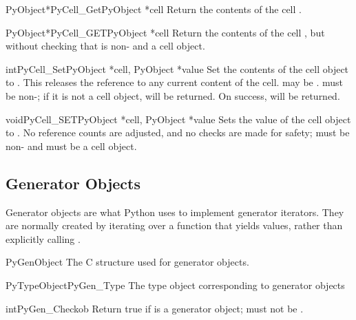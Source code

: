\begin{cfuncdesc}{PyObject*}{PyCell_Get}{PyObject *cell}
  Return the contents of the cell .
\end{cfuncdesc}

\begin{cfuncdesc}{PyObject*}{PyCell_GET}{PyObject *cell}
  Return the contents of the cell , but without checking
  that  is non-\NULL{} and a cell object.
\end{cfuncdesc}

\begin{cfuncdesc}{int}{PyCell_Set}{PyObject *cell, PyObject *value}
  Set the contents of the cell object  to .  This
  releases the reference to any current content of the cell.
   may be \NULL{}.   must be non-\NULL{}; if it is
  not a cell object,  will be returned.  On success, 
  will be returned.
\end{cfuncdesc}

\begin{cfuncdesc}{void}{PyCell_SET}{PyObject *cell, PyObject *value}
  Sets the value of the cell object  to .  No
  reference counts are adjusted, and no checks are made for safety;
   must be non-\NULL{} and must be a cell object.
\end{cfuncdesc}


\subsection{Generator Objects \label{gen-objects}}

Generator objects are what Python uses to implement generator iterators.
They are normally created by iterating over a function that yields values,
rather than explicitly calling .

\begin{ctypedesc}{PyGenObject}
  The C structure used for generator objects.
\end{ctypedesc}

\begin{cvardesc}{PyTypeObject}{PyGen_Type}
  The type object corresponding to generator objects
\end{cvardesc}

\begin{cfuncdesc}{int}{PyGen_Check}{ob}
  Return true if  is a generator object;  must not be
  \NULL{}.
\end{cfuncdesc}

